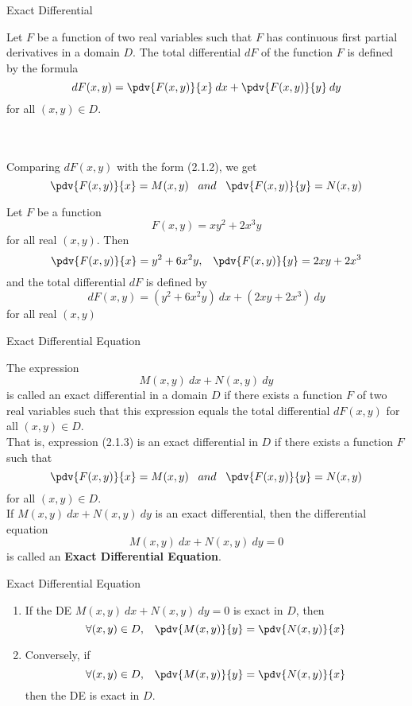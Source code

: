 \begin{definition}{Exact Differential}
    
    Let $F$ be a function of two real variables such that  $F$ has continuous first partial derivatives in a domain $D$. The total differential $dF$ of the function $F$ is defined by the formula
    \[
        d{F(x,y)} = \pdv{F(x,y)}{x} \: dx + \pdv{F(x,y)}{y} \: dy
    \]
    for all $(x,y) \in D$.
\end{definition} \\~\\

Comparing $dF(x,y)$ with the form (2.1.2), we get
\[
    \pdv{F(x,y)}{x} = M(x,y) \;\;\; and \;\;\;
    \pdv{F(x,y)}{y} = N(x,y)
\]

\begin{example}{}
    
    Let $F$ be a function \[
        F(x,y) = xy^2 + 2x^3y
    \] for all real $(x,y)$. Then
    \[
        \pdv{F(x,y)}{x} = y^2 + 6x^2y ,\;\;\;
        \pdv{F(x,y)}{y} = 2xy + 2x^3
    \]
    and the total differential $dF$ is defined by \[
        dF(x,y) = (y^2 + 6x^2y) \: dx + (2xy + 2x^3) \: dy
    \]
    for all real $(x,y)$
\end{example}

\begin{definition}{Exact Differential Equation}
    
    The expression
    \begin{equation}
        M(x,y) \: d{x} + N(x,y) \: d{y}
    \end{equation}
    is called an exact differential in a domain $D$ if there exists a function $F$ of two real variables such that this expression equals the total differential $dF(x,y)$ for all $(x,y) \in D$. \\
    That is, expression (2.1.3) is an exact differential in $D$ if there exists a function $F$ such that
\[
    \pdv{F(x,y)}{x} = M(x,y) \;\;\; and \;\;\;
    \pdv{F(x,y)}{y} = N(x,y)
\]
for all $(x,y) \in D$. \\
If $M(x,y) \: d{x} + N(x,y) \: d{y}$ is an exact differential, then the differential equation
\[ M(x,y) \: d{x} + N(x,y) \: d{y} = 0 \]
is called an \textbf{Exact Differential Equation}.
\end{definition}

\begin{theorem}{Exact Differential Equation}
    
    \begin{enumerate}
        \item If the DE $M(x,y) \: d{x} + N(x,y) \: d{y} = 0$ is exact in $D$, then
            \[ \forall (x,y)\in D, \;\;\; \pdv{M(x,y)}{y} = \pdv{N(x,y)}{x} \]
        \item Conversely, if 
            \[ \forall (x,y)\in D, \;\;\; \pdv{M(x,y)}{y} = \pdv{N(x,y)}{x} \]
        then the DE is exact in $D$.
    \end{enumerate}
\end{theorem} \\~\\

